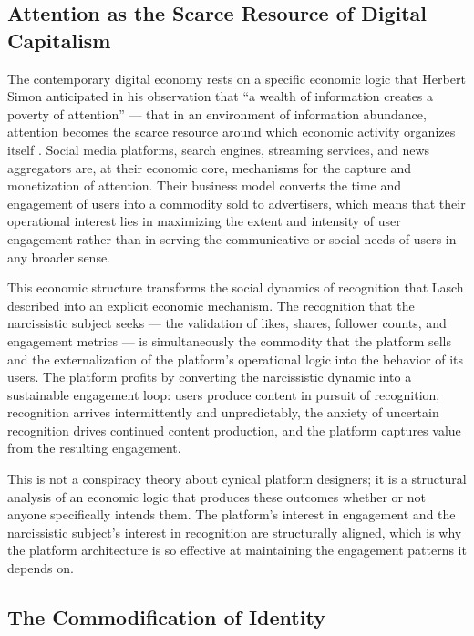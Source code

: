 \documentclass[12pt]{memoir}
\begin{document}
\subsection{Attention as the Scarce Resource of Digital Capitalism}

The contemporary digital economy rests on a specific economic logic that Herbert Simon
anticipated in his observation that \enquote{a wealth of information creates a poverty
of attention} — that in an environment of information abundance, attention becomes the
scarce resource around which economic activity organizes itself \citep{sennet1998corrosion}.
Social media platforms, search engines, streaming services, and news aggregators are,
at their economic core, mechanisms for the capture and monetization of attention. Their
business model converts the time and engagement of users into a commodity sold to
advertisers, which means that their operational interest lies in maximizing the extent
and intensity of user engagement rather than in serving the communicative or social
needs of users in any broader sense.

This economic structure transforms the social dynamics of recognition that Lasch
described into an explicit economic mechanism. The recognition that the narcissistic
subject seeks — the validation of likes, shares, follower counts, and engagement
metrics — is simultaneously the commodity that the platform sells and the
externalization of the platform's operational logic into the behavior of its users.
The platform profits by converting the narcissistic dynamic into a sustainable
engagement loop: users produce content in pursuit of recognition, recognition arrives
intermittently and unpredictably, the anxiety of uncertain recognition drives continued
content production, and the platform captures value from the resulting engagement.

This is not a conspiracy theory about cynical platform designers; it is a structural
analysis of an economic logic that produces these outcomes whether or not anyone
specifically intends them. The platform's interest in engagement and the narcissistic
subject's interest in recognition are structurally aligned, which is why the platform
architecture is so effective at maintaining the engagement patterns it depends on.

\subsection{The Commodification of Identity}
\end{document}
